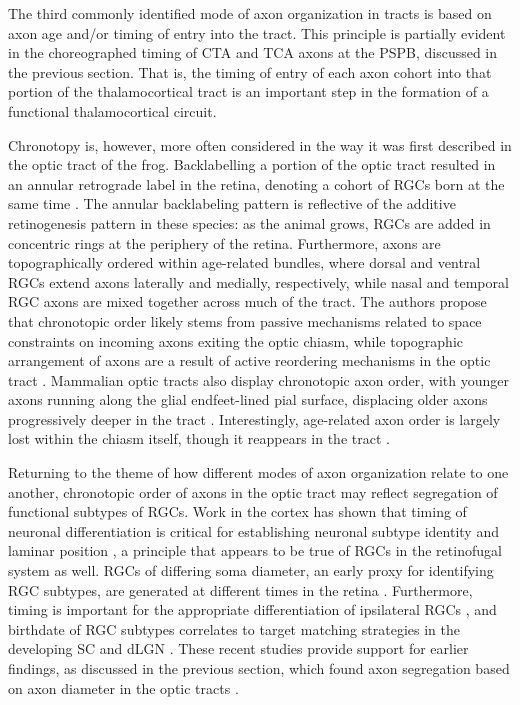 The third commonly identified mode of axon organization in tracts is based on axon age and/or timing of entry into the tract. 
This principle is partially evident in the choreographed timing of CTA and TCA axons at the PSPB, discussed in the previous section.
That is, the timing of entry of each axon cohort into that portion of the thalamocortical tract is an important step in the formation of a functional thalamocortical circuit.

Chronotopy is, however, more often considered in the way it was first described in the optic tract of the frog.
Backlabelling a portion of the optic tract resulted in an annular retrograde label in the retina, denoting a cohort of RGCs born at the same time \cite{fawcett1984fibre,reh1983organization}.
The annular backlabeling pattern is reflective of the additive retinogenesis pattern in these species: as the animal grows, RGCs are added in concentric rings at the periphery of the retina.
Furthermore, axons are topographically ordered within age-related bundles, where dorsal and ventral RGCs extend axons laterally and medially, respectively, while nasal and temporal RGC axons are mixed together across much of the tract.
The authors propose that chronotopic order likely stems from passive mechanisms related to space constraints on incoming axons exiting the optic chiasm, while topographic arrangement of axons are a result of active reordering mechanisms in the optic tract \cite{reh1983organization}.
Mammalian optic tracts also display chronotopic axon order, with younger axons running along the glial endfeet-lined pial surface, displacing older axons progressively deeper in the tract \cite{colello1992observations,reese1987distributionrat,reese1990fibre,reese1997chronotopic,walsh1985age}. %
Interestingly, age-related axon order is largely lost within the chiasm itself, though it reappears in the tract \cite{colello1998changing}.

Returning to the theme of how different modes of axon organization relate to one another, chronotopic order of axons in the optic tract may reflect segregation of functional subtypes of RGCs.
Work in the cortex has shown that timing of neuronal differentiation is critical for establishing neuronal subtype identity and laminar position \cite{molyneaux2007neuronal}, a principle that appears to be true of RGCs in the retinofugal system as well.
RGCs of differing soma diameter, an early proxy for identifying RGC subtypes, are generated at different times in the retina \cite{rapaport1995spatiotemporal,reese1994birthdates}.
Furthermore, timing is important for the appropriate differentiation of ipsilateral RGCs \cite{bhansali2014delayed}, and birthdate of RGC subtypes correlates to target matching strategies in the developing SC and dLGN \cite{osterhout2014birthdate}.
These recent studies provide support for earlier findings, as discussed in the previous section, which found axon segregation based on axon diameter in the optic tracts \cite{reese1987distributionrat,guillery1982arrangement,torrealba1982studies,reese1990fibre}.

